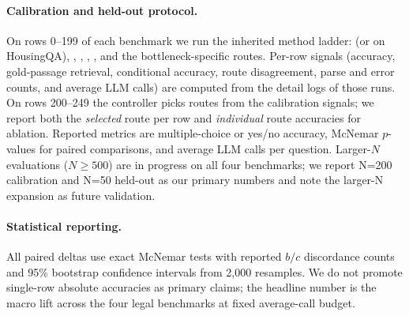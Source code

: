 \paragraph{Calibration and held-out protocol.} On rows 0--199 of each
benchmark we run the inherited method ladder:  (or
 on HousingQA), ,
, , ,
and the bottleneck-specific \controller{} routes. Per-row signals (accuracy,
gold-passage retrieval, conditional accuracy, route disagreement, parse and
error counts, and average LLM calls) are computed from the detail logs of
those runs. On rows 200--249 the controller picks routes from the calibration
signals; we report both the \emph{selected} route per row and
\emph{individual} route accuracies for ablation. Reported metrics are
multiple-choice or yes/no accuracy, McNemar $p$-values for paired
comparisons, and average LLM calls per question. Larger-$N$ evaluations
($N{\geq}500$) are in progress on all four benchmarks; we report N=200
calibration and N=50 held-out as our primary numbers and note the larger-N
expansion as future validation.

\paragraph{Statistical reporting.} All paired deltas use exact McNemar tests
with reported $b/c$ discordance counts and 95\% bootstrap confidence intervals
from 2{,}000 resamples. We do not promote single-row absolute accuracies as
primary claims; the headline number is the macro lift across the four legal
benchmarks at fixed average-call budget.
